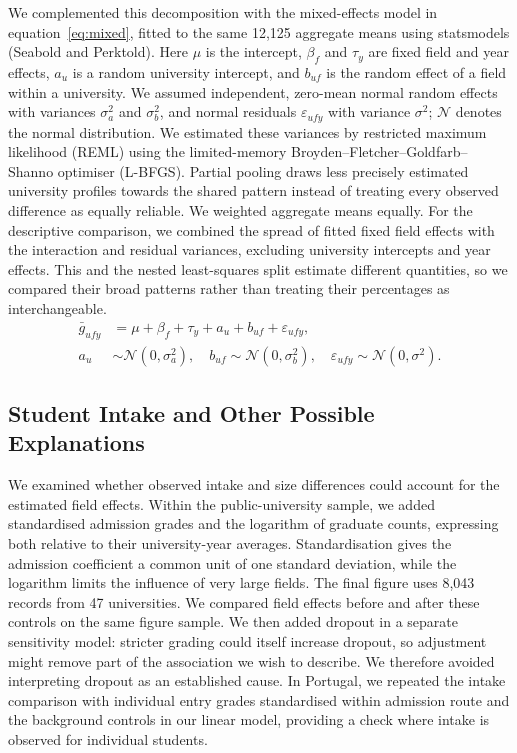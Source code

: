 We complemented this decomposition with the mixed-effects model in equation~\eqref{eq:mixed}, fitted to the same 12,125 aggregate means using statsmodels (Seabold and Perktold). Here $\mu$ is the intercept, $\beta_f$ and $\tau_y$ are fixed field and year effects, $a_u$ is a random university intercept, and $b_{uf}$ is the random effect of a field within a university. We assumed independent, zero-mean normal random effects with variances $\sigma_a^2$ and $\sigma_b^2$, and normal residuals $\varepsilon_{ufy}$ with variance $\sigma^2$; $\mathcal N$ denotes the normal distribution. We estimated these variances by restricted maximum likelihood (REML) using the limited-memory Broyden--Fletcher--Goldfarb--Shanno optimiser (L-BFGS). Partial pooling draws less precisely estimated university profiles towards the shared pattern instead of treating every observed difference as equally reliable. We weighted aggregate means equally. For the descriptive comparison, we combined the spread of fitted fixed field effects with the interaction and residual variances, excluding university intercepts and year effects. This and the nested least-squares split estimate different quantities, so we compared their broad patterns rather than treating their percentages as interchangeable.
\begin{equation}
  \begin{aligned}
  \bar g_{ufy} &= \mu + \beta_f + \tau_y + a_u + b_{uf} + \varepsilon_{ufy},\\
  a_u &\sim \mathcal N(0,\sigma_a^2),\quad b_{uf} \sim \mathcal N(0,\sigma_b^2),\quad \varepsilon_{ufy} \sim \mathcal N(0,\sigma^2).
  \end{aligned}
  \label{eq:mixed}
\end{equation}
\subsection{Student Intake and Other Possible Explanations}
\label{sec:methods-confounders}

We examined whether observed intake and size differences could account for the estimated field effects. Within the public-university sample, we added standardised admission grades and the logarithm of graduate counts, expressing both relative to their university-year averages. Standardisation gives the admission coefficient a common unit of one standard deviation, while the logarithm limits the influence of very large fields. The final figure uses 8,043 records from 47 universities. We compared field effects before and after these controls on the same figure sample. We then added dropout in a separate sensitivity model: stricter grading could itself increase dropout, so adjustment might remove part of the association we wish to describe. We therefore avoided interpreting dropout as an established cause. In Portugal, we repeated the intake comparison with individual entry grades standardised within admission route and the background controls in our linear model, providing a check where intake is observed for individual students.
